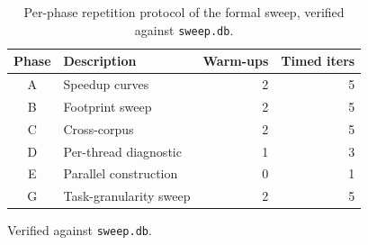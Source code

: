 \begin{table}[H]
    \centering
    \caption{Per-phase repetition protocol of the formal sweep, verified against \texttt{sweep.db}.}
    \label{tab:protocol}
    \small
    \begin{tabular}{@{} c l r r @{}}
        \toprule
        \textbf{Phase} & \textbf{Description} & \textbf{Warm-ups} & \textbf{Timed iters} \\
        \midrule
        A & Speedup curves        & 2 & 5 \\
        B & Footprint sweep       & 2 & 5 \\
        C & Cross-corpus          & 2 & 5 \\
        D & Per-thread diagnostic & 1 & 3 \\
        E & Parallel construction & 0 & 1 \\
        G & Task-granularity sweep & 2 & 5 \\
        \bottomrule
    \end{tabular}

    {\footnotesize\raggedright Verified against \texttt{sweep.db}.\par}
\end{table}

